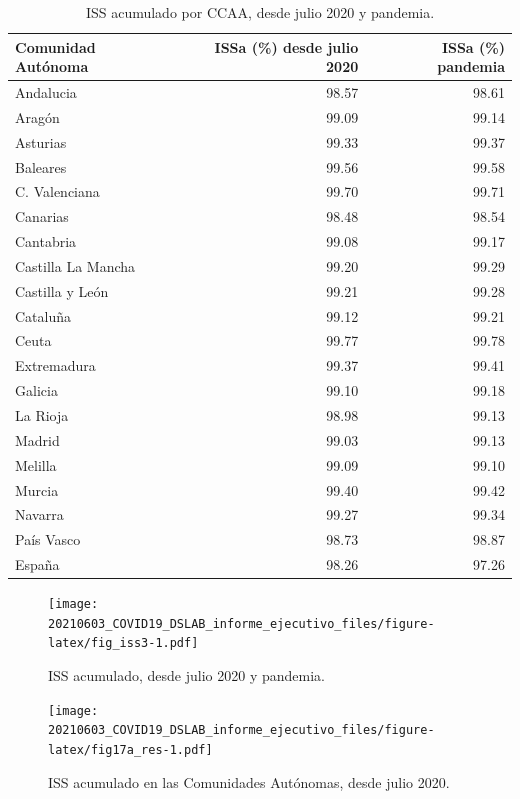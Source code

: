 \documentclass[
  11pt,
]{article}
\begin{document}
\begin{table}[!h]

\caption{\label{tab:tabla}ISS acumulado por CCAA, desde julio 2020 y pandemia.}
\centering
\fontsize{9}{11}\selectfont
\begin{tabular}[t]{l|r|r}
\hline
Comunidad Autónoma & ISSa (\%) desde julio 2020 & ISSa (\%) pandemia\\
\hline
Andalucia & 98.57 & 98.61\\
\hline
Aragón & 99.09 & 99.14\\
\hline
Asturias & 99.33 & 99.37\\
\hline
Baleares & 99.56 & 99.58\\
\hline
C. Valenciana & 99.70 & 99.71\\
\hline
Canarias & 98.48 & 98.54\\
\hline
Cantabria & 99.08 & 99.17\\
\hline
Castilla La Mancha & 99.20 & 99.29\\
\hline
Castilla y León & 99.21 & 99.28\\
\hline
Cataluña & 99.12 & 99.21\\
\hline
Ceuta & 99.77 & 99.78\\
\hline
Extremadura & 99.37 & 99.41\\
\hline
Galicia & 99.10 & 99.18\\
\hline
La Rioja & 98.98 & 99.13\\
\hline
Madrid & 99.03 & 99.13\\
\hline
Melilla & 99.09 & 99.10\\
\hline
Murcia & 99.40 & 99.42\\
\hline
Navarra & 99.27 & 99.34\\
\hline
País Vasco & 98.73 & 98.87\\
\hline
España & 98.26 & 97.26\\
\hline
\end{tabular}
\end{table}

\begin{figure}
\centering
\texttt{[image: 20210603\_COVID19\_DSLAB\_informe\_ejecutivo\_files/figure-latex/fig\_iss3-1.pdf]}
\caption{\label{fig:fig_iss3} ISS acumulado, desde julio 2020 y
pandemia.}
\end{figure}

\vspace{0.2cm}

\begin{figure}
\centering
\texttt{[image: 20210603\_COVID19\_DSLAB\_informe\_ejecutivo\_files/figure-latex/fig17a\_res-1.pdf]}
\caption{\label{fig:fig17a_res} ISS acumulado en las Comunidades
Autónomas, desde julio 2020.}
\end{figure}
\end{document}
